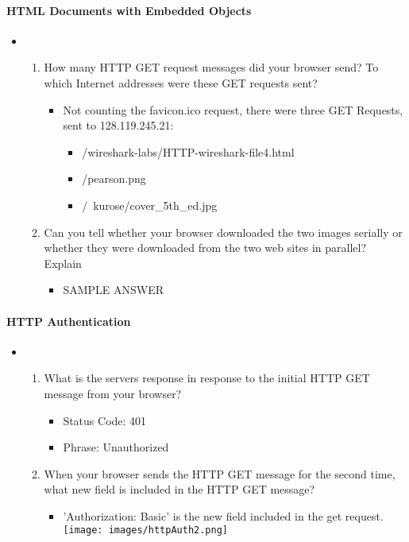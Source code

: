 \documentclass{article}
\begin{document}
  \paragraph{HTML Documents with Embedded Objects}
  \begin{itemize}
    \item\begin{enumerate}
      \item How many HTTP GET request messages did your browser send? To which Internet addresses were these GET requests sent?
        \begin{itemize}
          \item Not counting the favicon.ico request, there were three GET Requests, sent to 128.119.245.21:
          \begin{itemize}
            \item /wireshark-labs/HTTP-wireshark-file4.html
            \item /pearson.png
            \item /~kurose/cover\_5th\_ed.jpg
          \end{itemize}
        \end{itemize}
      \item Can you tell whether your browser downloaded the two images serially or whether they were downloaded from the two web sites in parallel? Explain
          \begin{itemize}
            \item SAMPLE ANSWER
          \end{itemize}
    \end{enumerate}
  \end{itemize}

  \paragraph{HTTP Authentication}
  \begin{itemize}
    \item\begin{enumerate}
      \item What is the servers response in response to the initial HTTP GET message from your browser?
        \begin{itemize}
          \item Status Code: 401
          \item Phrase: Unauthorized
        \end{itemize}
      \item When your browser sends the HTTP GET message for the second time, what new field is included in the HTTP GET message?
          \begin{itemize}
            \item 'Authorization: Basic' is the new field included in the get request.
            \texttt{[image: images/httpAuth2.png]}
          \end{itemize}
    \end{enumerate}
  \end{itemize}
\end{document}
